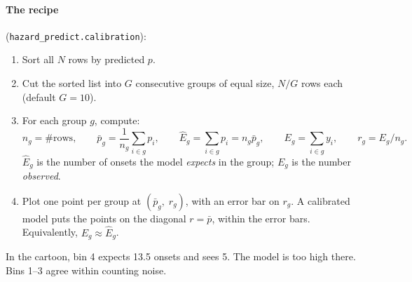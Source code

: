 \documentclass[11pt]{article}
\begin{document}
\paragraph{The recipe} (\texttt{hazard\_predict.calibration}):
\begin{enumerate}
\item Sort all $N$ rows by predicted $p$.
\item Cut the sorted list into $G$ consecutive groups of equal size, $N/G$ rows
  each (default $G=10$).
\item For each group $g$, compute:
  \[
  n_g=\#\text{rows},\qquad
  \bar p_g = \frac{1}{n_g}\sum_{i\in g}p_i ,\qquad
  \hat E_g=\sum_{i\in g}p_i = n_g\bar p_g,\qquad
  E_g = \sum_{i\in g}y_i,\qquad
  r_g = E_g/n_g .
  \]
  $\hat E_g$ is the number of onsets the model \emph{expects} in the group; $E_g$
  is the number \emph{observed}.
\item Plot one point per group at $(\bar p_g,\; r_g)$, with an error bar on
  $r_g$. A calibrated model puts the points on the diagonal $r=\bar p$, within
  the error bars. Equivalently, $E_g\approx\hat E_g$.
\end{enumerate}

\begin{center}
\end{center}

In the cartoon, bin 4 expects 13.5 onsets and sees 5. The model is too high
there. Bins 1--3 agree within counting noise.
\end{document}

